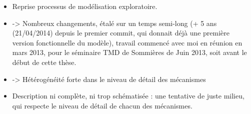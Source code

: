 \begin{itemize}
	\item Reprise processus de modélisation exploratoire.
	\item -> Nombreux changements, étalé sur un temps semi-long (+ 5 ans (21/04/2014) depuis le premier commit, qui donnait déjà une première version fonctionnelle du modèle), travail commencé avec moi en réunion en mars 2013, pour le séminaire TMD de Sommières de Juin 2013, soit avant le début de cette thèse. 
	\item -> Hétérogénéité forte dans le niveau de détail des mécanismes
	\item Description ni complète, ni trop schématisée : une tentative de juste milieu, qui respecte le niveau de détail de chacun des mécanismes.
\end{itemize}
